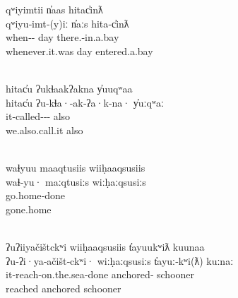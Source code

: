 \begin{exe}
  \glllll qʷiyimtii         n̓aas hitac̓inƛ\\
          qʷiyu‑imt‑(y)iː             n̓aːs           hita‑c̓inƛ\\
          when‑‑ day            there.‑in.a.bay\\
          whenever.it.was             day            entered.a.bay\\
          { }                                \\
          \vfix

  \clearpage

  \glllll hitac̓u ʔukɬaakʔakna                y̓uuqʷaa\\
          hitac̓u           ʔu‑kɬa·‑ak‑ʔa·k‑na·                   y̓uːqʷaː\\
                  it‑called‑‑‑ also\\
                  we.also.call.it                       also\\
          { }                                           \\
          \vfix

  \glllll waɬyuu maaqtusiis wiiḥaaqsusiis\\
          waɬ‑yu·          maːqtusiːs           wiːḥaːqsusiːs\\
          go.home‑done                 \\
          gone.home                    \\
                               { }\\
          \vfix

  \glllll ʔuʔiiyačištckʷi wiiḥaaqsusiis t̓ayuukʷiƛ kuunaa\\
          ʔu‑ʔi·ya‑ačišt‑ckʷi·      wiːḥaːqsusiːs           t̓ayuː‑kʷi(ƛ)        kuːnaː\\
          it‑reach‑on.the.sea‑done                 anchored‑   schooner\\
          reached                                  anchored            schooner\\
                                                      \\
          \vfix


\end{exe}
